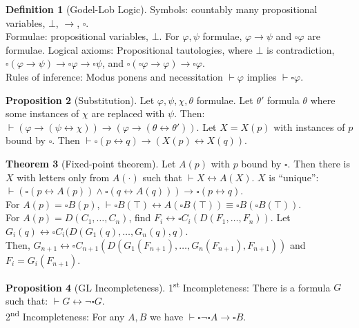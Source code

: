 \documentclass[a4paper,10pt]{article}
\theoremstyle{definition}
\newtheorem{theorem}{Theorem}
\newtheorem{definition}[theorem]{Definition}
\newtheorem{proposition}[theorem]{Proposition}
\let\phi\varphi
\newcommand{\proves}{\vdash}
\begin{document}
\begin{definition}[Godel-Lob Logic]
    Symbols: countably many propositional variables, $\bot$, $\rightarrow$, $\square$. \\Formulae: propositional variables, $\bot$. For $\phi, \psi$ formulae, $\phi \rightarrow \psi$ and $\square \phi$ are formulae.
    Logical axioms: Propositional tautologies, where $\bot$ is contradiction, $\square(\phi \rightarrow \psi) \rightarrow \square \phi \rightarrow \square \psi$, and $\square(\square \phi \rightarrow \phi) \rightarrow \square \phi$. \\
    Rules of inference: Modus ponens and necessitation $\proves \phi$ implies $\proves \square \phi$.
\end{definition}

\begin{proposition}[Substitution]
    Let $\phi, \psi, \chi, \theta$ formulae. Let $\theta'$ formula $\theta$ where some instances of $\chi$ are replaced with $\psi$. Then: $\proves (\phi \rightarrow (\psi \leftrightarrow \chi))\rightarrow (\phi \rightarrow (\theta \leftrightarrow \theta'))$.
    Let $X = X(p)$ with instances of $p$ bound by $\square$.
    Then $\proves \square(p \leftrightarrow q) \rightarrow (X(p) \leftrightarrow X(q))$.
\end{proposition}

\begin{theorem}[Fixed-point theorem]
    Let $A(p)$ with $p$ bound by $\square$. Then there is $X$ with letters only from $A(\cdot)$ such that $\proves X \leftrightarrow A(X)$. $X$ is ``unique'': $\proves (\square(p \leftrightarrow A(p)) \land \square(q \leftrightarrow A(q))) \rightarrow \square (p \leftrightarrow q)$.\\
    For $A(p) = \square B(p)$, $\proves \square B(\top) \leftrightarrow A(\square B(\top)) \equiv \square B(\square B(\top))$. \\For $A(p) = D(C_1, \ldots, C_n)$, find $F_i \leftrightarrow \square C_i(D(F_1, \ldots, F_n))$. Let $G_i(q) \leftrightarrow \square C_i(D(G_1(q), \ldots, G_n(q), q)$. \\Then, $G_{n+1} \leftrightarrow \square C_{n+1}(D(G_1(F_{n+1}), \ldots, G_n(F_{n+1}), F_{n+1}))$ and $F_i = G_i(F_{n+1})$.
\end{theorem}

\begin{proposition}[GL Incompleteness]
    1\textsuperscript{st} Incompleteness: There is a formula $G$ such that: $\proves G \leftrightarrow \neg \square G$.\\
    2\textsuperscript{nd} Incompleteness: For any $A, B$ we have $\proves \square \neg \square A \rightarrow \square B$.
\end{proposition}
\end{document}
